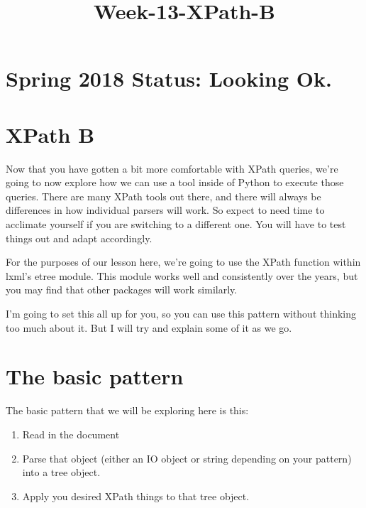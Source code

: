 \documentclass[11pt]{article}
\title{Week-13-XPath-B}
\providecommand{\tightlist}{%
      \setlength{\itemsep}{0pt}\setlength{\parskip}{0pt}}
\begin{document}
    
    
    \maketitle
    
    

    
    \section{Spring 2018 Status: Looking
Ok.}\label{spring-2018-status-looking-ok.}

\section{XPath B}\label{xpath-b}

Now that you have gotten a bit more comfortable with XPath queries,
we're going to now explore how we can use a tool inside of Python to
execute those queries. There are many XPath tools out there, and there
will always be differences in how individual parsers will work. So
expect to need time to acclimate yourself if you are switching to a
different one. You will have to test things out and adapt accordingly.

For the purposes of our lesson here, we're going to use the XPath
function within lxml's etree module. This module works well and
consistently over the years, but you may find that other packages will
work similarly.

I'm going to set this all up for you, so you can use this pattern
without thinking too much about it. But I will try and explain some of
it as we go.

    \section{The basic pattern}\label{the-basic-pattern}

The basic pattern that we will be exploring here is this:

\begin{enumerate}
\def\labelenumi{\arabic{enumi}.}
\tightlist
\item
  Read in the document
\item
  Parse that object (either an IO object or string depending on your
  pattern) into a tree object.
\item
  Apply you desired XPath things to that tree object.
\end{enumerate}
\end{document}
